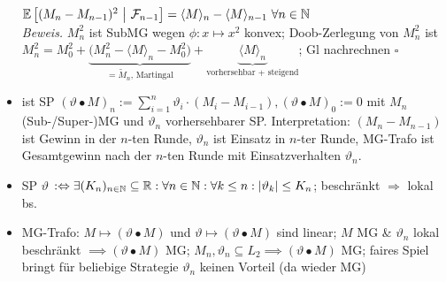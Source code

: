 \documentclass[12pt]{scrartcl}
\begin{document}
\begin{itemize}
		$\mathbb{E}\left[(M_n-M_{n-1})^2~\big|~\mathcal{F}_{n-1}\right]=\langle M\rangle_n-\langle M\rangle_{n-1}~\forall n\in\mathbb{N}$\\
		\textit{Beweis.} $M_n^2$ ist SubMG wegen $\phi:x\mapsto x^2$ konvex; Doob-Zerlegung von $M_n^2$ ist\\
		$M_n^2=M_0^2+\underbrace{\big(M_n^2-\langle M\rangle_n-M_0^2\big)}_{=\tilde{M}_n\text{, Martingal}}+\underbrace{\langle M\rangle_n}_{\text{vorhersehbar + steigend}}$; Gl nachrechnen $\square$
		\item {} ist SP $(\vartheta\bullet M)_n:=\sum\limits_{i=1}^n\vartheta_i\cdot(M_i-M_{i-1}),(\vartheta\bullet M)_0:=0$
		mit $M_n$ (Sub-/Super-)MG und $\vartheta_n$ vorhersehbarer SP. Interpretation: $(M_n-M_{n-1})$ ist Gewinn in der $n$-ten Runde, $\vartheta_n$ ist Einsatz in $n$-ter Runde, MG-Trafo ist Gesamtgewinn nach der $n$-ten Runde mit Einsatzverhalten $\vartheta_n$.
		\item SP $\vartheta$  $:\Leftrightarrow\exists(K_n)_{n\in\mathbb{N}}\subseteq\mathbb{R}:\forall n\in\mathbb{N}:\forall k\leq n:|\vartheta_k|\leq K_n$; beschränkt $\Rightarrow$ lokal bs.
		\item MG-Trafo: $M\mapsto(\vartheta\bullet M)$ und $\vartheta\mapsto(\vartheta\bullet M)$ sind linear; $M$ MG \& $\vartheta_n$ lokal beschränkt $\implies(\vartheta\bullet M)$ MG; $M_n,\vartheta_n\subseteq L_2\implies(\vartheta\bullet M)$ MG; faires Spiel bringt für beliebige Strategie $\vartheta_n$  keinen Vorteil (da wieder MG)
	\end{itemize}
	
\end{document}
